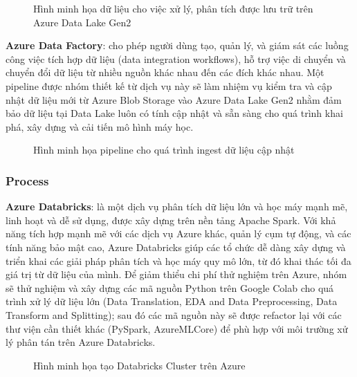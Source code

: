 \begin{figure}[h]
    \centering
    \caption{Hình minh họa dữ liệu cho việc xử lý, phân tích được lưu trữ trên Azure Data Lake Gen2}
    \label{fig:image4}
\end{figure}

\textbf{Azure Data Factory}: cho phép người dùng tạo, quản lý, và giám sát các luồng công việc tích hợp dữ liệu (data integration workflows), hỗ trợ việc di chuyển và chuyển đổi dữ liệu từ nhiều nguồn khác nhau đến các đích khác nhau. Một pipeline được nhóm thiết kế từ dịch vụ này sẽ làm nhiệm vụ kiểm tra và cập nhật dữ liệu mới từ Azure Blob Storage vào Azure Data Lake Gen2 nhằm đảm bảo dữ liệu tại Data Lake luôn có tính cập nhật và sẵn sàng cho quá trình khai phá, xây dựng và cải tiến mô hình máy học.

\begin{figure}[h]
    \centering
    \caption{Hình minh họa pipeline cho quá trình ingest dữ liệu cập nhật}
    \label{fig:image5}
\end{figure}

\subsubsection{Process}
\textbf{Azure Databricks}: là một dịch vụ phân tích dữ liệu lớn và học máy mạnh mẽ, linh hoạt và dễ sử dụng, được xây dựng trên nền tảng Apache Spark. Với khả năng tích hợp mạnh mẽ với các dịch vụ Azure khác, quản lý cụm tự động, và các tính năng bảo mật cao, Azure Databricks giúp các tổ chức dễ dàng xây dựng và triển khai các giải pháp phân tích và học máy quy mô lớn, từ đó khai thác tối đa giá trị từ dữ liệu của mình. Để giảm thiểu chi phí thử nghiệm trên Azure, nhóm sẽ thử nghiệm và xây dựng các mã nguồn Python trên Google Colab cho quá trình xử lý dữ liệu lớn (Data Translation, EDA and Data Preprocessing, Data Transform and Splitting); sau đó các mã nguồn này sẽ được refactor lại với các thư viện cần thiết khác (PySpark, AzureMLCore) để phù hợp với môi trường xử lý phân tán trên Azure Databricks.

\begin{figure}[h]
    \centering
    \caption{Hình minh họa tạo Databricks Cluster trên Azure}
    \label{fig:image6}
\end{figure}